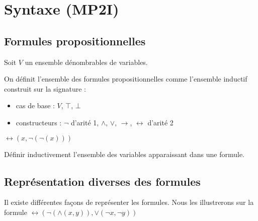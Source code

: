 
\section{Syntaxe (MP2I)}

\subsection{Formules propositionnelles}

\begin{definition}
	Soit $V$ un ensemble dénombrables de variables.
	
	On définit l'ensemble des formules propositionnelles comme l'ensemble inductif construit sur la signature : \begin{itemize}[label=$\star$]
		\item cas de base : $V$, $\top$, $\bot$
		\item constructeurs : $\neg$ d'arité 1, $\wedge$, $\vee$, $\rightarrow$, $\leftrightarrow$ d'arité 2
	\end{itemize}
\end{definition}

\begin{example}
	$\leftrightarrow(x, \neg(\neg(x)))$
\end{example}

\begin{exercise}
	Définir inductivement l'ensemble des variables apparaissant dans une formule.
\end{exercise}

\subsection{Représentation diverses des formules}

\noindent Il existe différentes façons de représenter les formules. Nous les illustrerons sur la formule $\leftrightarrow (\neg (\wedge(x, y)), \vee(\neg x, \neg y))$


